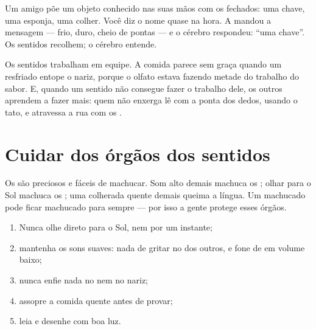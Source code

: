 \begin{example}\label{ex:g1:the-five-senses:dark}
Um amigo põe um objeto conhecido nas suas mãos com os 
fechados: uma chave, uma esponja, uma colher. Você diz o nome quase
na hora. A  mandou a mensagem --- frio, duro, cheio de pontas
--- e o cérebro respondeu: ``uma chave''. Os sentidos recolhem; o
cérebro entende.
\end{example}

\begin{remark}\label{rem:g1:the-five-senses:together}
Os sentidos trabalham em equipe. A comida parece sem graça quando um
resfriado entope o nariz, porque o olfato estava fazendo metade do
trabalho do sabor. E, quando um sentido não consegue fazer o
trabalho dele, os outros aprendem a fazer mais: quem não enxerga lê
com a ponta dos dedos, usando o tato, e atravessa a rua com os
.
\end{remark}

\section{Cuidar dos órgãos dos sentidos}

\begin{proposition}\label{prop:g1:the-five-senses:fragile}
Os  são preciosos e fáceis de machucar. Som alto
demais machuca os ; olhar para o Sol machuca os ; uma
colherada quente demais queima a língua. Um 
machucado pode ficar machucado para sempre --- por isso a gente
protege esses órgãos.
\end{proposition}
\admitted

\begin{method}\label{met:g1:the-five-senses:protect}
\begin{enumerate}
  \item Nunca olhe direto para o Sol, nem por um instante;
  \item mantenha os sons suaves: nada de gritar no  dos
        outros, e fone de  em volume baixo;
  \item nunca enfie nada no  nem no nariz;
  \item assopre a comida quente antes de provar;
  \item leia e desenhe com boa luz.
\end{enumerate}
\end{method}

